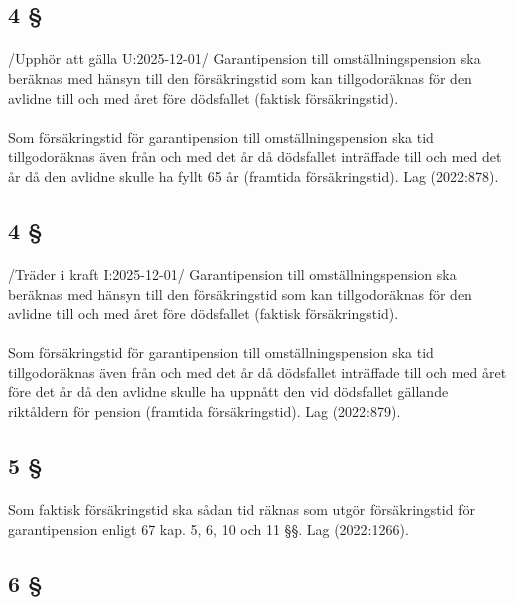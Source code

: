 \documentclass[a4paper,notitlepage,openany,10pt]{book}
\begin{document}
\subsection*{4 §}
\paragraph*{}
/Upphör att gälla U:2025-12-01/
Garantipension till omställningspension ska beräknas med hänsyn till den försäkringstid som kan tillgodoräknas för den avlidne till och med året före dödsfallet (faktisk försäkringstid).
\paragraph*{}
Som försäkringstid för garantipension till omställningspension ska tid tillgodoräknas även från och med det år då dödsfallet inträffade till och med det år då den avlidne skulle ha fyllt 65 år (framtida försäkringstid).
Lag (2022:878).
\subsection*{4 §}
\paragraph*{}
/Träder i kraft I:2025-12-01/
Garantipension till omställningspension ska beräknas med hänsyn till den försäkringstid som kan tillgodoräknas för den avlidne till och med året före dödsfallet (faktisk försäkringstid).
\paragraph*{}
Som försäkringstid för garantipension till omställningspension ska tid tillgodoräknas även från och med det år då dödsfallet inträffade till och med året före det år då den avlidne skulle ha uppnått den vid dödsfallet gällande riktåldern för pension (framtida försäkringstid).
Lag (2022:879).
\subsection*{5 §}
\paragraph*{}
Som faktisk försäkringstid ska sådan tid räknas som utgör försäkringstid för garantipension enligt 67 kap. 5, 6, 10 och 11 §§.
Lag (2022:1266).
\subsection*{6 §}
\end{document}
